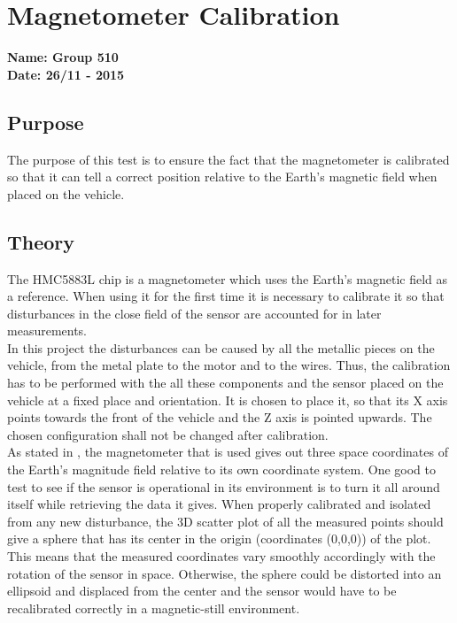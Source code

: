 \pagebreak
\section{Magnetometer Calibration} \label{app:magnetoCalibration}
\textbf{Name: Group 510}\\
\textbf{Date: 26/11 - 2015}

\subsection{Purpose}
The purpose of this test is to ensure the fact that the magnetometer is calibrated so that it can tell a correct position relative to the Earth's magnetic field when placed on the vehicle.

\subsection{Theory}
The HMC5883L chip is a magnetometer which uses the Earth's magnetic field as a reference. When using it for the first time it is necessary to calibrate it so that disturbances in the close field of the sensor are accounted for in later measurements.\\
%
In this project the disturbances can be caused by all the metallic pieces on the vehicle, from the metal plate to the motor and to the wires. Thus, the calibration has to be performed with the all these components and the sensor placed on the vehicle at a fixed place and orientation. It is chosen to place it, so that its X axis points towards the front of the vehicle and the Z axis is pointed upwards. The chosen configuration shall not be changed after calibration.\\
%
As stated in , the magnetometer that is used gives out three space coordinates of the Earth's magnitude field relative to its own coordinate system. One good to test to see if the sensor is operational in its environment is to turn it all around itself while retrieving the data it gives. When properly calibrated and isolated from any new disturbance, the 3D scatter plot of all the measured points should give a sphere that has its center in the origin (coordinates (0,0,0)) of the plot. This means that the measured coordinates vary smoothly accordingly with the rotation of the sensor in space. Otherwise, the sphere could be distorted into an ellipsoid and displaced from the center and the sensor would have to be recalibrated correctly in a magnetic-still environment.\\
